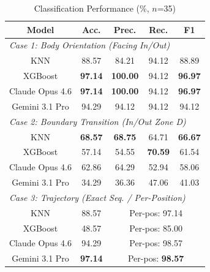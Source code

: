 \documentclass[conference]{IEEEtran}
\begin{document}
\begin{table}[htbp]
\caption{Classification Performance (\%, $n$=35)}
\begin{center}
\begin{tabular}{|c|c|c|c|c|}
\hline
\textbf{Model} & \textbf{Acc.} & \textbf{Prec.} & \textbf{Rec.} & \textbf{F1} \\
\hline
\multicolumn{5}{|l|}{\textit{Case 1: Body Orientation (Facing In/Out)}} \\
\hline
KNN            & 88.57 & 84.21 & 94.12 & 88.89 \\
\hline
XGBoost        & \textbf{97.14} & \textbf{100.00} & 94.12 & \textbf{96.97} \\
\hline
Claude Opus 4.6 & \textbf{97.14} & \textbf{100.00} & 94.12 & \textbf{96.97} \\
\hline
Gemini 3.1 Pro  & 94.29 & 94.12 & 94.12 & 94.12 \\
\hline
\multicolumn{5}{|l|}{\textit{Case 2: Boundary Transition (In/Out Zone D)}} \\
\hline
KNN            & \textbf{68.57} & \textbf{68.75} & 64.71 & \textbf{66.67} \\
\hline
XGBoost        & 57.14 & 54.55 & \textbf{70.59} & 61.54 \\
\hline
Claude Opus 4.6 & 62.86 & 64.29 & 52.94 & 58.06 \\
\hline
Gemini 3.1 Pro  & 34.29 & 36.36 & 47.06 & 41.03 \\
\hline
\multicolumn{5}{|l|}{\textit{Case 3: Trajectory (Exact Seq. / Per-Position)}} \\
\hline
KNN            & 88.57 & \multicolumn{3}{c|}{Per-pos: 97.14} \\
\hline
XGBoost        & 48.57 & \multicolumn{3}{c|}{Per-pos: 85.00} \\
\hline
Claude Opus 4.6 & 94.29 & \multicolumn{3}{c|}{Per-pos: 98.57} \\
\hline
Gemini 3.1 Pro  & \textbf{97.14} & \multicolumn{3}{c|}{Per-pos: \textbf{98.57}} \\
\hline
\end{tabular}
\label{tab:accuracy}
\end{center}
\end{table}
\end{document}
